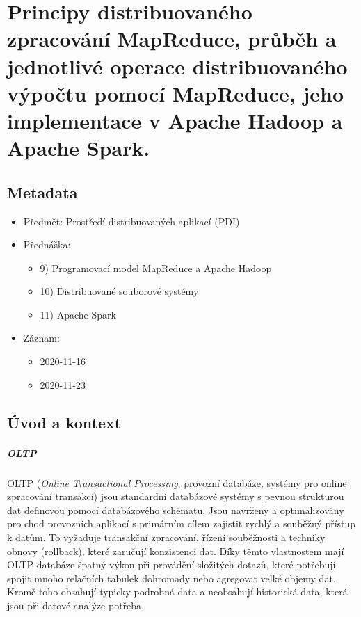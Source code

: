 

\chapter{Principy distribuovaného zpracování MapReduce, průběh a jednotlivé operace distribuovaného výpočtu pomocí MapReduce, jeho implementace v Apache Hadoop a Apache Spark.}


\section{Metadata}

\begin{itemize}
    \item Předmět: Prostředí distribuovaných aplikací (PDI)
    \item Přednáška:
    \begin{itemize}
        \item 9) Programovací model MapReduce a Apache Hadoop
        \item 10) Distribuované souborové systémy
        \item 11) Apache Spark
    \end{itemize}
    \item Záznam:
    \begin{itemize}
        \item 2020-11-16
        \item 2020-11-23
    \end{itemize}
\end{itemize}


\section{Úvod a kontext}

\paragraph*{OLTP} OLTP (\textit{Online Transactional Processing}, provozní databáze, systémy pro online zpracování transakcí) jsou standardní databázové systémy s pevnou strukturou dat definovou pomocí databázového schématu. Jsou navrženy a optimalizovány pro chod provozních aplikací s primárním cílem zajistit rychlý a souběžný přístup k datům. To vyžaduje transakční zpracování, řízení souběžnosti a techniky obnovy (rollback), které zaručují konzistenci dat. Díky těmto vlastnostem mají OLTP databáze špatný výkon při provádění složitých dotazů, které potřebují spojit mnoho relačních tabulek dohromady nebo agregovat velké objemy dat. Kromě toho obsahují typicky podrobná data a neobsahují historická data, která jsou při datové analýze potřeba.

